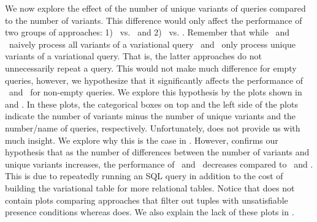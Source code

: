 We now explore the effect of the number of unique variants of queries compared to the
number of variants. This difference would only affect the performance of two groups of 
approaches: 1) \nbf\ vs. \ubf\ and 2) \nbfi\ vs. \ubfi. 
%
Remember that while \nbf\ and \nbfi\ naively process all variants of a variational query
\ubf\ and \ubfi\ only process unique variants of a variational query. That is, the latter approaches
do not unnecessarily repeat a query. This would not make much difference for empty queries, however,
we hypothesize that it significantly affects the performance of \nbf\ and \nbfi\ for non-empty queries. 
%
We explore this hypothesis by the plots shown in  and .
In these plots, the categorical boxes on top and the left side of the plots indicate
the number of variants minus the number of unique variants and the number/name of queries, respectively.
%
Unfortunately,  does not provide us with much insight. We explore why this 
is the case in . However,  confirms our hypothesis that
as the number of differences between the number of variants and unique variants increases, the 
performance of \nbf\ and \nbfi\ decreases compared to \ubf\ and \ubfi. This is due to repeatedly
running an SQL query in addition to the cost of building the variational table for more relational 
tables. 
%
Notice that  does not contain plots comparing approaches that filter out
tuples with unsatisfiable presence conditions whereas   does. 
We also explain the lack of these plots in .


